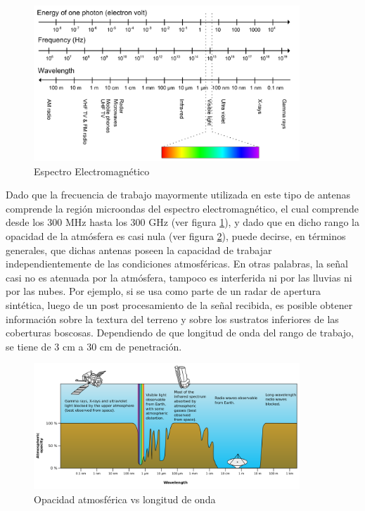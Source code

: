 \begin{figure}[H]
 \centering
 \includegraphics[width=10cm]{gfx/electromagneticSpectrum.png}
 \caption{Espectro Electromagnético \cite{electromagneticField}}
 \label{fig:spectrum}
\end{figure}

Dado que la frecuencia de trabajo mayormente utilizada en este tipo de antenas comprende la región microondas del espectro
electromagnético, el cual comprende desde los 300 MHz hasta los 300 GHz (ver figura \ref{fig:spectrum}), y dado que en dicho rango la 
opacidad de la atmósfera es casi nula (ver figura \ref{fig:atmosphere}), puede decirse, en términos generales, que dichas 
antenas poseen la capacidad de trabajar independientemente de las condiciones atmosféricas. En otras palabras, la señal casi no es 
atenuada por la atmósfera, tampoco es interferida ni por las lluvias ni por las nubes. Por ejemplo, si se usa como parte de un 
radar de apertura sintética, luego de un post procesamiento de la señal recibida, es posible obtener información sobre la 
textura del terreno y sobre los sustratos inferiores de las coberturas boscosas. Dependiendo de que longitud de onda del rango de
trabajo, se tiene de 3 cm a 30 cm de penetración.

\begin{figure}[H]
 \centering
 \includegraphics[width=10cm]{gfx/AtmosphericOpacity.png}
 \caption{Opacidad atmosférica vs longitud de onda \cite{electromagneticOpacity}}
 \label{fig:atmosphere}
\end{figure}

